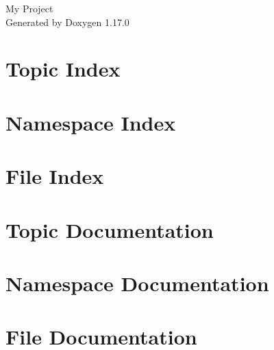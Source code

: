 \documentclass[twoside]{book}
\newcommand{\+}{\discretionary{\mbox{\scriptsize$\hookleftarrow$}}{}{}}
\newcommand{\clearemptydoublepage}{%
    \newpage{\pagestyle{empty}\cleardoublepage}%
  }
\begin{document}
  \raggedbottom
    \hypersetup{pageanchor=false,
                bookmarksnumbered=true,
                pdfencoding=unicode
               }
  \begin{titlepage}
  \vspace*{7cm}
  \begin{center}%
  {\Large My Project}\\
  \vspace*{1cm}
  {\large Generated by Doxygen 1.17.0}\\
  \end{center}
  \end{titlepage}
  \clearemptydoublepage
  \tableofcontents
  \clearemptydoublepage
  \hypersetup{pageanchor=true}

\chapter{Topic Index}

\chapter{Namespace Index}

\chapter{File Index}

\chapter{Topic Documentation}

\chapter{Namespace Documentation}

\chapter{File Documentation}







  \backmatter
  \newpage
  \clearemptydoublepage
  \printindex
\end{document}
